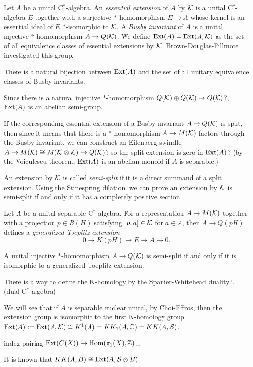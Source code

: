 \documentclass{../../large}
\begin{document}
\begin{prb}
Let $A$ be a unital C$^*$-algebra.
An \emph{essential extension} of $A$ by $\mathcal{K}$ is a unital C$^*$-algebra $E$ together with a surjective $*$-homomorphism $E\to A$ whose kernel is an essential ideal of $E$ $*$-isomorphic to $\mathcal{K}$.
A \emph{Busby invariant} of $A$ is a unital injective $*$-homomorphism $A\to Q(\mathcal{K})$.
We define $\operatorname{Ext}(A)=\operatorname{Ext}(A,\mathcal{K})$ as the set of all equivalence classes of essential extensions by $\mathcal{K}$.
Brown-Douglas-Fillmore investigated this group.
\begin{parts}
\item There is a natural bijection between $\operatorname{Ext}(A)$ and the set of all unitary equivalence classes of Busby invariants.
\item Since there is a natural injective $*$-homomorphism $Q(\mathcal{K})\oplus Q(\mathcal{K})\to Q(\mathcal{K})$?, $\operatorname{Ext}(A)$ is an abelian semi-group.
\end{parts}


If the corresponding essential extension of a Busby invariant $A\to Q(\mathcal{K})$ is split, then since it means that there is a $*$-homomorphism $A\to M(\mathcal{K})$ factors through the Busby invariant, we can construct an Eilenberg swindle $A\to M(\mathcal{K})\cong M(\mathcal{K}\otimes \mathcal{K})\to Q(\mathcal{K})$? so the split extension is zero in $\operatorname{Ext}(A)$? (by the Voiculescu theorem, $\operatorname{Ext}(A)$ is an abelian monoid if $A$ is separable.)

An extension by $\mathcal{K}$ is called \emph{semi-split} if it is a direct summand of a split extension.
Using the Stinespring dilation, we can prove an extension by $\mathcal{K}$ is semi-split if and only if it has a completely positive section.


Let $A$ be a unital separable C$^*$-algebra.
For a representation $A\to M(\mathcal{K})$ together with a projection $p\in B(H)$ satisfying $[p,a]\in\mathcal{K}$ for $a\in A$, then $A\to Q(pH)$ defines a \emph{generalized Toeplitz extension}
\[0\to K(pH)\to E\to A\to0.\]

A unital injective $*$-homomorphism $A\to Q(\mathcal{K})$ is semi-split if and only if it is isomorphic to a generalized Toeplitz extension.

There is a way to define the K-homology by the Spanier-Whitehead duality?. (dual C$^*$-algebra)


We will see that if $A$ is separable nuclear unital, by Choi-Effros, then the extension group is isomorphic to the first K-homology group $\operatorname{Ext}(A):=\operatorname{Ext}(A,\mathcal{K})\cong K^1(A)=KK_1(A,\mathbb{C})=KK(A,\mathcal{S})$.

index pairing $\operatorname{Ext}(C(X))\to\operatorname{Hom}(\pi_1(X),\mathbb{Z})$...


It is known that $KK(A,B)\cong\operatorname{Ext}(A,\mathcal{S}\otimes B)$
\end{prb}
\end{document}

